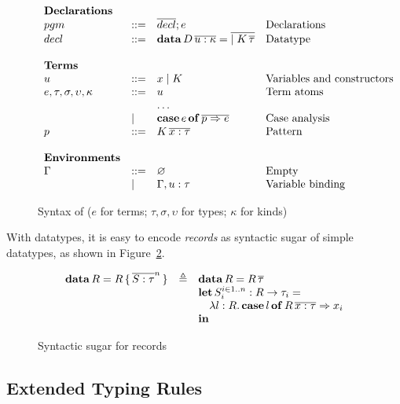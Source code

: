 \begin{figure}[ht]
\centering
\small
\[
  \begin{array}{llll}
    \textbf{Declarations} \\
    pgm &::= & \overline{decl}; e & \text{Declarations} \\
    decl &::= & \mathbf{data}\,D\,\overline{u : \kappa} = \overline{\mid K\,\overline{\tau}} & \text{Datatype} \\ \\
    \textbf{Terms} \\
    u &::= & x \mid K & \text{Variables and constructors} \\
    e,\tau,\sigma,\upsilon,\kappa &::= & u & \text{Term atoms} \\
    & & \dots \\
    & \mid & \mathbf{case}\,e\,\mathbf{of}\,\overline{p \Rightarrow e} & \text{Case analysis} \\
    p &::= & K\,\overline{x : \tau} & \text{Pattern} \\ \\
    \textbf{Environments} \\
    \Gamma &::= &\varnothing & \text{Empty} \\
    & \mid & \Gamma,u:\tau & \text{Variable binding}
  \end{array}
\]
  \caption{Syntax of \sufcc ($e$ for terms; $\tau,\sigma,\upsilon$ for types; $\kappa$ for kinds)}\label{fig:datasyn}
\end{figure}

With datatypes, it is easy to encode \emph{records} as syntactic sugar of simple datatypes, as shown in Figure~\ref{fig:records}.

\begin{figure}[ht]
\centering
\[
  \begin{array}{lll}
    \mathbf{data}\,R = R\,\{\,\overline{S:\tau}^n\,\} & \triangleq & \mathbf{data}\,R = R\,\overline{\tau} \\
    & & \mathbf{let}\,S_{i}^{i \in 1..n} : R \rightarrow \tau_{i} = \\
    & &\quad \lambda l:R.\,\mathbf{case}\,l\,\mathbf{of}\, R\,\overline{x:\tau} \Rightarrow x_{i} \\
    & &\mathbf{in}
  \end{array}
\]
\caption{Syntactic sugar for records}\label{fig:records}
\end{figure}

\subsection{Extended Typing Rules}

